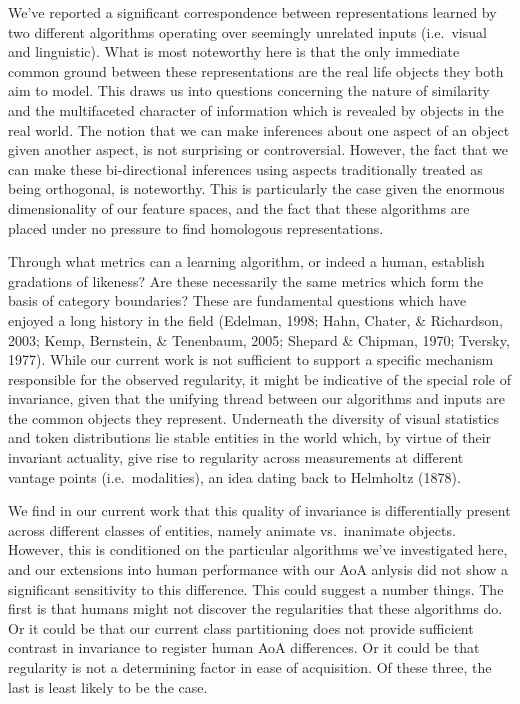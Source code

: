 \documentclass[10pt, letterpaper]{article}
\begin{document}
We've reported a significant correspondence between representations
learned by two different algorithms operating over seemingly unrelated
inputs (i.e.~visual and linguistic). What is most noteworthy here is
that the only immediate common ground between these representations are
the real life objects they both aim to model. This draws us into
questions concerning the nature of similarity and the multifaceted
character of information which is revealed by objects in the real world.
The notion that we can make inferences about one aspect of an object
given another aspect, is not surprising or controversial. However, the
fact that we can make these bi-directional inferences using aspects
traditionally treated as being orthogonal, is noteworthy. This is
particularly the case given the enormous dimensionality of our feature
spaces, and the fact that these algorithms are placed under no pressure
to find homologous representations.

Through what metrics can a learning algorithm, or indeed a human,
establish gradations of likeness? Are these necessarily the same metrics
which form the basis of category boundaries? These are fundamental
questions which have enjoyed a long history in the field (Edelman, 1998;
Hahn, Chater, \& Richardson, 2003; Kemp, Bernstein, \& Tenenbaum, 2005;
Shepard \& Chipman, 1970; Tversky, 1977). While our current work is not
sufficient to support a specific mechanism responsible for the observed
regularity, it might be indicative of the special role of invariance,
given that the unifying thread between our algorithms and inputs are the
common objects they represent. Underneath the diversity of visual
statistics and token distributions lie stable entities in the world
which, by virtue of their invariant actuality, give rise to regularity
across measurements at different vantage points (i.e.~modalities), an
idea dating back to Helmholtz (1878).

We find in our current work that this quality of invariance is
differentially present across different classes of entities, namely
animate vs.~inanimate objects. However, this is conditioned on the
particular algorithms we've investigated here, and our extensions into
human performance with our AoA anlysis did not show a significant
sensitivity to this difference. This could suggest a number things. The
first is that humans might not discover the regularities that these
algorithms do. Or it could be that our current class partitioning does
not provide sufficient contrast in invariance to register human AoA
differences. Or it could be that regularity is not a determining factor
in ease of acquisition. Of these three, the last is least likely to be
the case.
\end{document}
